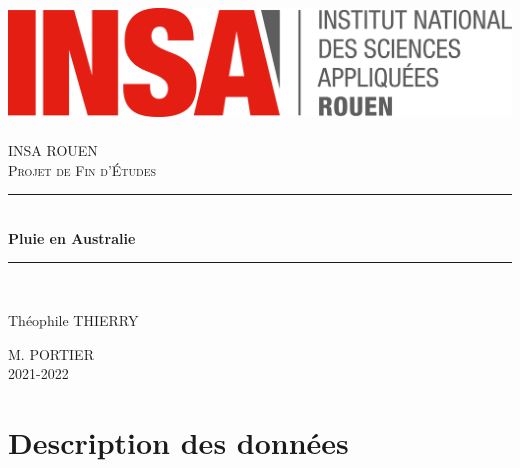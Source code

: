 \documentclass{article}
\begin{document}
\newcommand{\HRule}{\rule{\linewidth}{0.5mm}}

\begin{titlepage}
  \begin{sffamily}
  \begin{center}
    \hfill
    \includegraphics[scale=0.06]{./Ressources/logoINSARouen.png}~\\[1.5cm]

    \textsc{\LARGE INSA ROUEN}\\[1cm]

    \textsc{\Large Projet de Fin d'Études}\\[1cm]

    \HRule \\[0.4cm]
    { \huge \bfseries Pluie en Australie\\[0.4cm] }

    \HRule \\[1cm]

    \begin{minipage}{0.4\textwidth}
      \begin{flushleft} \large
        Théophile THIERRY\\
      \end{flushleft}
    \end{minipage}
    \begin{minipage}{0.4\textwidth}
      \begin{flushright} \large
        \textsc{M. PORTIER}\\
         2021-2022\\
      \end{flushright}
    \end{minipage}

    \vfill

  \end{center}
  \end{sffamily}
\end{titlepage}

\tableofcontents
\newpage

\part{Description des données}
\end{document}

